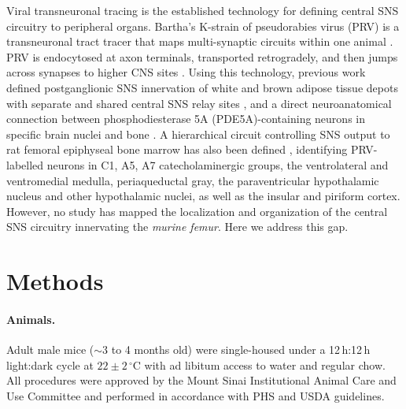 \documentclass[11pt]{article}
\begin{document}
Viral transneuronal tracing is the established technology for defining central SNS circuitry to peripheral organs. Bartha's K-strain of pseudorabies virus (PRV) is a transneuronal tract tracer that maps multi-synaptic circuits within one animal \cite{ekstrand2008,enquist2002,song2005a}. PRV is endocytosed at axon terminals, transported retrogradely, and then jumps across synapses to higher CNS sites \cite{curanovic2009}. Using this technology, previous work defined postganglionic SNS innervation of white and brown adipose tissue depots with separate and shared central SNS relay sites \cite{ryu2014,ryu2015}, and a direct neuroanatomical connection between phosphodiesterase 5A (PDE5A)-containing neurons in specific brain nuclei and bone \cite{kim2020pde5a}. A hierarchical circuit controlling SNS output to rat femoral epiphyseal bone marrow has also been defined \cite{denes2005}, identifying PRV-labelled neurons in C1, A5, A7 catecholaminergic groups, the ventrolateral and ventromedial medulla, periaqueductal gray, the paraventricular hypothalamic nucleus and other hypothalamic nuclei, as well as the insular and piriform cortex. However, no study has mapped the localization and organization of the central SNS circuitry innervating the \emph{murine femur}. Here we address this gap.

\section{Methods}

\paragraph{Animals.} Adult male mice ($\sim$3 to 4 months old) were single-housed under a 12\,h:12\,h light:dark cycle at $22 \pm 2\,^\circ\mathrm{C}$ with ad libitum access to water and regular chow. All procedures were approved by the Mount Sinai Institutional Animal Care and Use Committee and performed in accordance with PHS and USDA guidelines.
\end{document}
